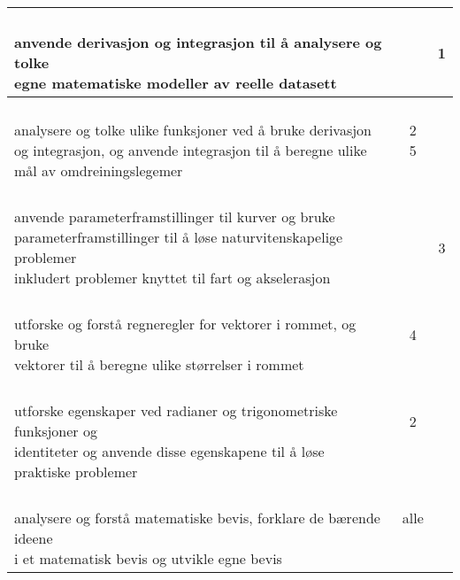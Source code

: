 \documentclass{article}
\begin{document}
\begin{center}
\begin{tabular}{p{10.5cm} | c | c |}
	\shortstack[l]{\\ anvende derivasjon og integrasjon til å analysere og tolke\\ egne matematiske modeller av reelle datasett
	} &\shortstack{\\{}} &\shortstack{1\\{}} \\ \hline
	
	\shortstack[l]{\\ analysere og tolke ulike funksjoner ved å bruke derivasjon\\ og integrasjon, og anvende integrasjon til å beregne ulike\\ mål av omdreiningslegemer
	} &\shortstack{2\\5\\{}} &\shortstack{} \\ \hline		
	
	\shortstack[l]{\\ anvende parameterframstillinger til kurver og bruke\\ parameterframstillinger til å løse naturvitenskapelige problemer\\ inkludert problemer knyttet til fart og akselerasjon
	} &\shortstack{\\{}} &\shortstack{\\{3}\\{}} \\ \hline
	
	\shortstack[l]{\\ utforske og forstå regneregler for vektorer i rommet, og bruke\\ vektorer til å beregne ulike størrelser i rommet
	} &\shortstack{4\\{}} &\shortstack{\\{}\\{}} \\ \hline
	
	\shortstack[l]{\\ utforske egenskaper ved radianer og trigonometriske funksjoner og\\ identiteter og anvende disse egenskapene til å løse \\praktiske problemer
	} &\shortstack{2\\{}\\{}} &\shortstack{\\{}\\{}} \\ \hline
	
	\shortstack[l]{\\ analysere og forstå matematiske bevis, forklare de bærende ideene\\ i et matematisk bevis og utvikle egne bevis
	} &\shortstack{alle\\{}\\{}} &\shortstack{\\{}\\{}} \\ \hline
\end{tabular}
\end{center} 
\end{document}
